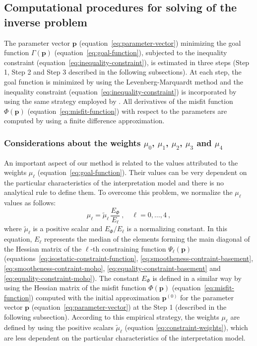 \documentclass[manuscript]{geophysics}
\begin{document}
\subsection{Computational procedures for solving of the inverse problem}

The parameter vector $\mathbf{p}$ (equation~\ref{eq:parameter-vector}) minimizing the
goal function $\Gamma (\mathbf{p})$ (equation~\ref{eq:goal-function}), subjected to
the inequality constraint (equation~\ref{eq:inequality-constraint}), is estimated 
in three steps (Step 1, Step 2 and Step 3 described in the following subsections). 
At each step, the goal function is minimized by using the Levenberg-Marquardt 
method \citep{silva-etal2001, aster-etal2005} and the inequality constraint 
(equation~\ref{eq:inequality-constraint}) is incorporated by using the same strategy 
employed by \citet{barbosa-etal1999}.
All derivatives of the misfit function $\Phi(\mathbf{p})$ (equation~\ref{eq:misfit-function})
with respect to the parameters are computed by using a finite difference approximation.

\subsubsection{Considerations about the weights $\mu_{0}$, $\mu_{1}$, $\mu_{2}$, $\mu_{3}$ and $\mu_{4}$}

An important aspect of our method is related to the values attributed to 
the weights $\mu_{\ell}$ (equation~\ref{eq:goal-function}).
Their values can be very dependent on the particular characteristics of the 
interpretation model and there is no analytical rule to define them. 
To overcome this problem, we normalize the $\mu_{\ell}$ values as follows:
\begin{equation}
	\mu_{\ell} = \tilde{\mu}_{\ell} \, \frac{E_{\Phi}}{E_{\ell}} \: 
	, \quad \ell = 0, \dots, 4 \: ,
	\label{eq:constraint-weights}
\end{equation}
where $\tilde{\mu}_{\ell}$ is a positive scalar and $E_{\Phi} / E_{\ell}$
is a normalizing constant. In this equation, $E_{\ell}$ represents the median 
of the elements forming the main diagonal of the Hessian matrix of the 
$\ell$-th constraining function $\Psi_{\ell}(\mathbf{p})$ 
(equations~\ref{eq:isostatic-constraint-function}, 
\ref{eq:smootheness-contraint-basement}, \ref{eq:smootheness-contraint-moho}, 
\ref{eq:equality-constraint-basement} and 
\ref{eq:equality-constraint-moho}). The constant $E_{\Phi}$ is defined in 
a similar way by using the Hessian matrix of the misfit function $\Phi(\mathbf{p})$ 
(equation~\ref{eq:misfit-function}) computed with 
the initial approximation $\mathbf{p}^{(0)}$ for the parameter vector $\mathbf{p}$ 
(equation~\ref{eq:parameter-vector}) at the Step 1 (described in the following subsection).
According to this empirical strategy, the weights $\mu_{\ell}$ are defined 
by using the positive scalars $\tilde{\mu}_{\ell}$ 
(equation \ref{eq:constraint-weights}), which are less dependent on the particular 
characteristics of the interpretation model.
\end{document}
